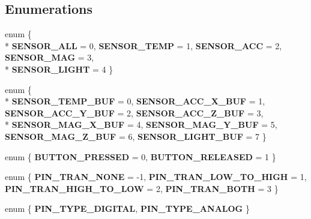 \subsection*{Enumerations}
\begin{DoxyCompactItemize}
\item 
\hypertarget{group___engduino_protocol_ga99fb83031ce9923c84392b4e92f956b5}{}enum \{ \\*
{\bfseries S\+E\+N\+S\+O\+R\+\_\+\+A\+L\+L} = 0, 
{\bfseries S\+E\+N\+S\+O\+R\+\_\+\+T\+E\+M\+P} = 1, 
{\bfseries S\+E\+N\+S\+O\+R\+\_\+\+A\+C\+C} = 2, 
{\bfseries S\+E\+N\+S\+O\+R\+\_\+\+M\+A\+G} = 3, 
\\*
{\bfseries S\+E\+N\+S\+O\+R\+\_\+\+L\+I\+G\+H\+T} = 4
 \}\label{group___engduino_protocol_ga99fb83031ce9923c84392b4e92f956b5}

\item 
\hypertarget{group___engduino_protocol_gabc6126af1d45847bc59afa0aa3216b04}{}enum \{ \\*
{\bfseries S\+E\+N\+S\+O\+R\+\_\+\+T\+E\+M\+P\+\_\+\+B\+U\+F} = 0, 
{\bfseries S\+E\+N\+S\+O\+R\+\_\+\+A\+C\+C\+\_\+\+X\+\_\+\+B\+U\+F} = 1, 
{\bfseries S\+E\+N\+S\+O\+R\+\_\+\+A\+C\+C\+\_\+\+Y\+\_\+\+B\+U\+F} = 2, 
{\bfseries S\+E\+N\+S\+O\+R\+\_\+\+A\+C\+C\+\_\+\+Z\+\_\+\+B\+U\+F} = 3, 
\\*
{\bfseries S\+E\+N\+S\+O\+R\+\_\+\+M\+A\+G\+\_\+\+X\+\_\+\+B\+U\+F} = 4, 
{\bfseries S\+E\+N\+S\+O\+R\+\_\+\+M\+A\+G\+\_\+\+Y\+\_\+\+B\+U\+F} = 5, 
{\bfseries S\+E\+N\+S\+O\+R\+\_\+\+M\+A\+G\+\_\+\+Z\+\_\+\+B\+U\+F} = 6, 
{\bfseries S\+E\+N\+S\+O\+R\+\_\+\+L\+I\+G\+H\+T\+\_\+\+B\+U\+F} = 7
 \}\label{group___engduino_protocol_gabc6126af1d45847bc59afa0aa3216b04}

\item 
\hypertarget{group___engduino_protocol_gadc29c2ff13d900c2f185ee95427fb06c}{}enum \{ {\bfseries B\+U\+T\+T\+O\+N\+\_\+\+P\+R\+E\+S\+S\+E\+D} = 0, 
{\bfseries B\+U\+T\+T\+O\+N\+\_\+\+R\+E\+L\+E\+A\+S\+E\+D} = 1
 \}\label{group___engduino_protocol_gadc29c2ff13d900c2f185ee95427fb06c}

\item 
\hypertarget{group___engduino_protocol_ga61dadd085c1777f559549e05962b2c9e}{}enum \{ {\bfseries P\+I\+N\+\_\+\+T\+R\+A\+N\+\_\+\+N\+O\+N\+E} = -\/1, 
{\bfseries P\+I\+N\+\_\+\+T\+R\+A\+N\+\_\+\+L\+O\+W\+\_\+\+T\+O\+\_\+\+H\+I\+G\+H} = 1, 
{\bfseries P\+I\+N\+\_\+\+T\+R\+A\+N\+\_\+\+H\+I\+G\+H\+\_\+\+T\+O\+\_\+\+L\+O\+W} = 2, 
{\bfseries P\+I\+N\+\_\+\+T\+R\+A\+N\+\_\+\+B\+O\+T\+H} = 3
 \}\label{group___engduino_protocol_ga61dadd085c1777f559549e05962b2c9e}

\item 
\hypertarget{group___engduino_protocol_ga726ca809ffd3d67ab4b8476646f26635}{}enum \{ {\bfseries P\+I\+N\+\_\+\+T\+Y\+P\+E\+\_\+\+D\+I\+G\+I\+T\+A\+L}, 
{\bfseries P\+I\+N\+\_\+\+T\+Y\+P\+E\+\_\+\+A\+N\+A\+L\+O\+G}
 \}\label{group___engduino_protocol_ga726ca809ffd3d67ab4b8476646f26635}

\end{DoxyCompactItemize}
